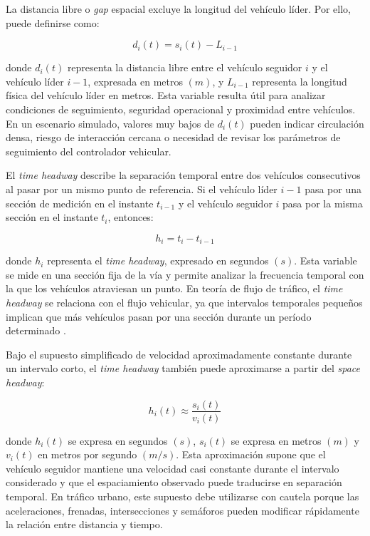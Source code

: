La distancia libre o \textit{gap} espacial excluye la longitud del vehículo líder. Por ello, puede definirse como:

\begin{equation}
d_i(t)=s_i(t)-L_{i-1}
\label{eq:gap_espacial}
\end{equation}

donde \(d_i(t)\) representa la distancia libre entre el vehículo seguidor \(i\) y el vehículo líder \(i-1\), expresada en metros \((m)\), y \(L_{i-1}\) representa la longitud física del vehículo líder en metros. Esta variable resulta útil para analizar condiciones de seguimiento, seguridad operacional y proximidad entre vehículos. En un escenario simulado, valores muy bajos de \(d_i(t)\) pueden indicar circulación densa, riesgo de interacción cercana o necesidad de revisar los parámetros de seguimiento del controlador vehicular.

El \textit{time headway} describe la separación temporal entre dos vehículos consecutivos al pasar por un mismo punto de referencia. Si el vehículo líder \(i-1\) pasa por una sección de medición en el instante \(t_{i-1}\) y el vehículo seguidor \(i\) pasa por la misma sección en el instante \(t_i\), entonces:

\begin{equation}
h_i=t_i-t_{i-1}
\label{eq:time_headway}
\end{equation}

donde \(h_i\) representa el \textit{time headway}, expresado en segundos \((s)\). Esta variable se mide en una sección fija de la vía y permite analizar la frecuencia temporal con la que los vehículos atraviesan un punto. En teoría de flujo de tráfico, el \textit{time headway} se relaciona con el flujo vehicular, ya que intervalos temporales pequeños implican que más vehículos pasan por una sección durante un período determinado \cite{fhwa2001trafficflow}.

Bajo el supuesto simplificado de velocidad aproximadamente constante durante un intervalo corto, el \textit{time headway} también puede aproximarse a partir del \textit{space headway}:

\begin{equation}
h_i(t) \approx \frac{s_i(t)}{v_i(t)}
\label{eq:headway_aproximado}
\end{equation}

donde \(h_i(t)\) se expresa en segundos \((s)\), \(s_i(t)\) se expresa en metros \((m)\) y \(v_i(t)\) en metros por segundo \((m/s)\). Esta aproximación supone que el vehículo seguidor mantiene una velocidad casi constante durante el intervalo considerado y que el espaciamiento observado puede traducirse en separación temporal. En tráfico urbano, este supuesto debe utilizarse con cautela porque las aceleraciones, frenadas, intersecciones y semáforos pueden modificar rápidamente la relación entre distancia y tiempo.

